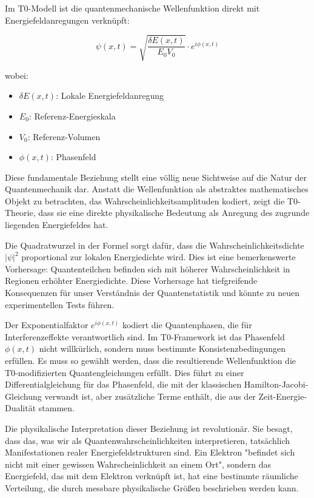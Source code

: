 \documentclass[12pt,a4paper]{article}
\newcommand{\deltaE}{\delta E}
\theoremstyle{definition}
\theoremstyle{remark}
\begin{document}
Im T0-Modell ist die quantenmechanische Wellenfunktion direkt mit Energiefeldanregungen verknüpft:

\begin{equation}
	\boxed{\psi(x,t) = \sqrt{\frac{\deltaE(x,t)}{E_0 V_0}} \cdot e^{i\phi(x,t)}}
	\label{eq:wavefunction_field}
\end{equation}

wobei:
\begin{itemize}
	\item $\deltaE(x,t)$: Lokale Energiefeldanregung
	\item $E_0$: Referenz-Energieskala
	\item $V_0$: Referenz-Volumen
	\item $\phi(x,t)$: Phasenfeld
\end{itemize}

Diese fundamentale Beziehung stellt eine völlig neue Sichtweise auf die Natur der Quantenmechanik dar. Anstatt die Wellenfunktion als abstraktes mathematisches Objekt zu betrachten, das Wahrscheinlichkeitsamplituden kodiert, zeigt die T0-Theorie, dass sie eine direkte physikalische Bedeutung als Anregung des zugrunde liegenden Energiefeldes hat.

Die Quadratwurzel in der Formel sorgt dafür, dass die Wahrscheinlichkeitsdichte $|\psi|^2$ proportional zur lokalen Energiedichte wird. Dies ist eine bemerkenswerte Vorhersage: Quantenteilchen befinden sich mit höherer Wahrscheinlichkeit in Regionen erhöhter Energiedichte. Diese Vorhersage hat tiefgreifende Konsequenzen für unser Verständnis der Quantenstatistik und könnte zu neuen experimentellen Tests führen.

Der Exponentialfaktor $e^{i\phi(x,t)}$ kodiert die Quantenphasen, die für Interferenzeffekte verantwortlich sind. Im T0-Framework ist das Phasenfeld $\phi(x,t)$ nicht willkürlich, sondern muss bestimmte Konsistenzbedingungen erfüllen. Es muss so gewählt werden, dass die resultierende Wellenfunktion die T0-modifizierten Quantengleichungen erfüllt. Dies führt zu einer Differentialgleichung für das Phasenfeld, die mit der klassischen Hamilton-Jacobi-Gleichung verwandt ist, aber zusätzliche Terme enthält, die aus der Zeit-Energie-Dualität stammen.

Die physikalische Interpretation dieser Beziehung ist revolutionär. Sie besagt, dass das, was wir als Quantenwahrscheinlichkeiten interpretieren, tatsächlich Manifestationen realer Energiefeldstrukturen sind. Ein Elektron "befindet sich nicht mit einer gewissen Wahrscheinlichkeit an einem Ort", sondern das Energiefeld, das mit dem Elektron verknüpft ist, hat eine bestimmte räumliche Verteilung, die durch messbare physikalische Größen beschrieben werden kann.
\end{document}
